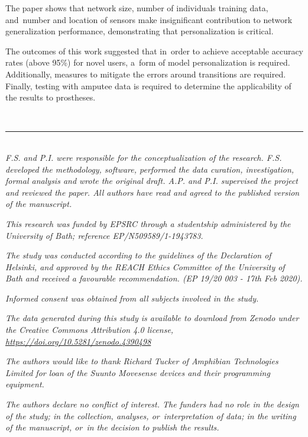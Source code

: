 The paper shows that network size, number of individuals training data, and~number and location of sensors make insignificant contribution to network generalization performance, demonstrating that personalization is critical.

The outcomes of this work suggested that in~order to achieve acceptable accuracy rates (above 95\%) for novel users, a~form of model personalization is required. Additionally, measures to mitigate the errors around transitions are required. Finally, testing with amputee data is required to determine the applicability of the results to prostheses.

\ \\

{\hrule height 0.5pt} \ \\

\textit{F.S. and P.I. were responsible for the conceptualization of the research. F.S. developed the methodology, software, performed the data curation, investigation, formal analysis and wrote the original draft. A.P. and P.I. supervised the project and reviewed the paper. All authors have read and agreed to the published version of the manuscript.}

\textit{This research was funded by EPSRC through a studentship administered by the University of Bath; reference EP/N509589/1-1943783.}

\textit{The study was conducted according to the guidelines of the Declaration of Helsinki, and approved by the REACH Ethics Committee of the University of Bath and received a favourable recommendation. (EP 19/20 003 - 17th Feb 2020).}

\textit{Informed consent was obtained from all subjects involved in the study.}

\textit{The data generated during this study is available to download from Zenodo under the Creative Commons Attribution 4.0 license, \href{https://doi.org/10.5281/zenodo.4390498}{https://doi.org/10.5281/zenodo.4390498}}

\textit{The authors would like to thank Richard Tucker of Amphibian Technologies Limited for loan of the Suunto Movesense devices and their programming equipment.}

\textit{The authors declare no conflict of interest. The funders had no role in the design of the study; in the collection, analyses, or~interpretation of data; in the writing of the manuscript, or~in the decision to publish the results.} 